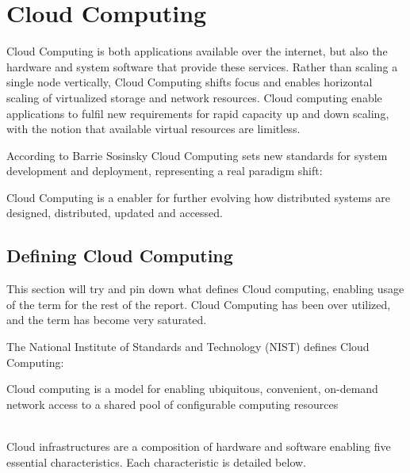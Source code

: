 \chapter{Cloud Computing}
\label{ch:cloud_computing}

Cloud Computing is both applications available over the internet, but also the hardware and system software that provide these services.
Rather than scaling a single node vertically, Cloud Computing shifts focus and enables horizontal scaling of virtualized storage and network resources\cite{armbrust2010view}. Cloud computing enable applications to fulfil new requirements for rapid capacity up and down scaling, with the notion that available virtual resources are limitless\cite{sosinsky2010cloud}.

According to Barrie Sosinsky\cite[p. 3 ]{sosinsky2010cloud} Cloud Computing sets new standards for system development and deployment, representing a real paradigm shift:

Cloud Computing is a enabler for further evolving how distributed systems are designed, distributed, updated and accessed.

\section{Defining Cloud Computing}
This section will try and pin down what defines Cloud computing, enabling usage of the term for the rest of the report. Cloud Computing has been over utilized, and the term has become very saturated.

The National Institute of Standards and Technology (NIST) defines Cloud Computing\cite{mell2011nist}:\\
\begin{definition}
Cloud computing is a model for enabling ubiquitous, convenient, on-demand network access to a shared pool of configurable computing resources
\end{definition}
\\
Cloud infrastructures are a composition of hardware and software enabling five essential characteristics. Each characteristic is detailed below.

